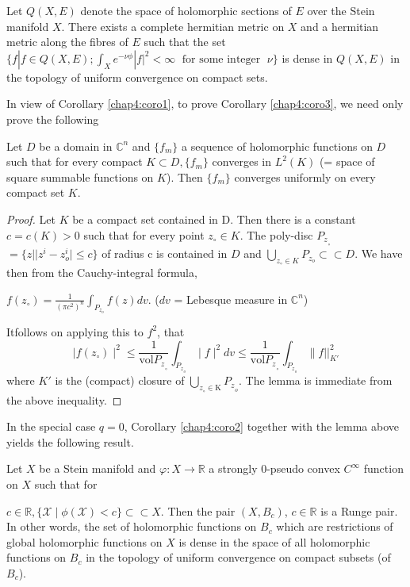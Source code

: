 \begin{corollary}\label{chap4:coro3}%
  Let $Q(X,E)$ denote the space of holomorphic sections of $E$ over the
  Stein manifold $X$. There exists a complete hermitian metric on $X$ and
  a hermitian metric along the fibres of $E$ such that the set
  $\{f| f \in Q (X,E); \int_X  e^{-\nu \phi} |f|^{2}< \infty \;
  \text{ for some integer } \; \nu \}$ is 
  dense in $Q(X,E)$ in the topology of uniform convergence on compact
  sets. 
\end{corollary}

In view of Corollary \ref{chap4:coro1}, to prove Corollary
\ref{chap4:coro3}, we need only prove the following 

\begin{lemma}\label{chap4:lem4.8}%
  Let $D$ be a domain in $\mathbb{C}^n$  and $\{ f_m\}$ a sequence of
  holomorphic functions on $D$ such that for every compact
  $K \subset D, \{f_m\}$ converges in
  $L^2 (K)$ (= space of square summable functions on
  $K$). Then $\{ f_m\}$ converges uniformly on every compact set
  $K$. 
\end{lemma}

\begin{proof}
  Let $K$ be a compact set contained in D. Then there is a constant
  $c = c (K) > 0$ such that for every point
  $ z_\circ \in K$. The poly-disc $P{_z}_{_\circ}$  
  $= \{z \big| |z^i-z^i_o \mid \leq c \}$ of radius c is contained in
  $D$ and $\bigcup\limits_{z_\circ \in K} P_{z_o} \subset
  \subset D$.
  We have then from the Cauchy-integral formula,
 
  $f(z_\circ) = \frac{1}{(\pi c^2)^n} \int_{P_{z_o}} f(z)
  dv$. ($dv$ = Lebesque measure in $\mathbb{C}^n$) 
 
  It\pageoriginale follows on applying this to $f^2$, that
  $$
  \mid f (z_\circ)\mid^2 \leqslant
  \frac{1}{\text{vol} P{_z}_{_\circ}} \int_{P{_z}_{_o}} \mid f \mid ^2
  dv \leqslant \frac{1}{\text{vol}P{_z}_{_\circ}} \int_{P{_z}_{_o}} \|
  f||^2_{K'}
  $$
  where $K'$ is the (compact) closure of ${\underset{z_\circ \in
      \text{K}}{\bigcup}} P{_z}_{_o}$. The lemma is immediate from the
  above inequality. 
\end{proof}

In the special case $q=0$, Corollary \ref{chap4:coro2} together with the lemma above
yields the following result. 
 
\begin{theorem}\label{chap4:thm4.5}%
  Let $X$ be a Stein manifold and $\varphi : X \rightarrow
  \mathbb{R}$ a strongly 0-pseudo convex $C^\infty$
  function on $X$ such that for 

  $c\in \mathbb{R}, \big \{\mathcal{X} \mid \phi \mathcal{(X)} <
  c\big \} \subset  \subset X$. Then the pair $(X,
  B_c)$, $c \in \mathbb{R}$ is a Runge  pair. In other
  words, the set of holomorphic functions on $B_c$ which are
  restrictions of global holomorphic functions on $X$ is dense in the
  space of all holomorphic functions on $B_c$ in the topology of
  uniform convergence on compact subsets (of $B_c$). 
\end{theorem}

